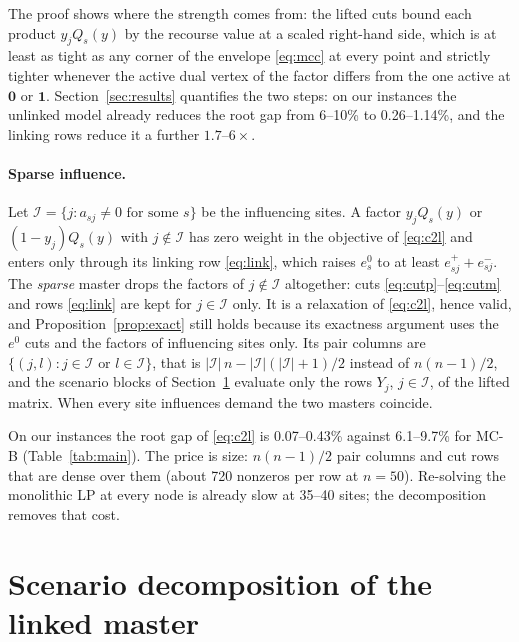 \documentclass[11pt]{article}
\begin{document}
The proof shows where the strength comes from: the lifted cuts bound each product $y_jQ_s(y)$ by the recourse
value at a scaled right-hand side, which is at least as tight as any corner of the envelope \eqref{eq:mcc} at every
point and strictly tighter whenever the active dual vertex of the factor differs from the one active at
$\mathbf 0$ or $\mathbf 1$. Section~\ref{sec:results} quantifies the two steps: on our instances the unlinked model
already reduces the root gap from 6--10\% to 0.26--1.14\%, and the linking rows reduce it a further
$1.7$--$6\times$.

\paragraph{Sparse influence.} Let $\mathcal I = \{j : a_{sj}\ne 0 \text{ for some } s\}$ be the influencing sites.
A factor $y_jQ_s(y)$ or $(1-y_j)Q_s(y)$ with $j\notin\mathcal I$ has zero weight in the objective of \eqref{eq:c2l}
and enters only through its linking row \eqref{eq:link}, which raises $e^0_s$ to at least $e^+_{sj}+e^-_{sj}$. The
\emph{sparse} master drops the factors of $j\notin\mathcal I$ altogether: cuts \eqref{eq:cutp}--\eqref{eq:cutm} and
rows \eqref{eq:link} are kept for $j\in\mathcal I$ only. It is a relaxation of \eqref{eq:c2l}, hence valid, and
Proposition~\ref{prop:exact} still holds because its exactness argument uses the $e^0$ cuts and the factors of
influencing sites only. Its pair columns are $\{(j,l): j\in\mathcal I \text{ or } l\in\mathcal I\}$, that is
$|\mathcal I|\,n - |\mathcal I|(|\mathcal I|+1)/2$ instead of $n(n-1)/2$, and the scenario blocks of
Section~\ref{sec:decomp} evaluate only the rows $Y_j$, $j\in\mathcal I$, of the lifted matrix. When every site
influences demand the two masters coincide.

On our instances the root gap of \eqref{eq:c2l} is 0.07--0.43\% against 6.1--9.7\% for \textsc{MC-B}
(Table~\ref{tab:main}). The price is size: $n(n-1)/2$ pair columns and cut rows that are dense over them (about
720 nonzeros per row at $n = 50$). Re-solving the monolithic LP at every node is already slow at 35--40 sites;
the decomposition removes that cost.

\section{Scenario decomposition of the linked master}\label{sec:decomp}
\end{document}
